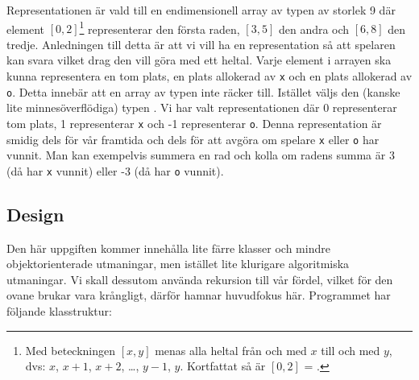 Representationen är vald till en endimensionell array av typen  av storlek 9 där element $[0,2]$\footnote{Med beteckningen $[x,y]$ menas alla heltal från och med $x$ till och med $y$, dvs: $x$, $x+1$, $x+2$, \ldots , $y-1$, $y$. Kortfattat så är $[0,2]$ = .} representerar den första raden, $[3,5]$ den andra och $[6,8]$ den tredje. Anledningen till detta är att vi vill ha en representation så att spelaren kan svara vilket drag den vill göra med ett heltal.
Varje element i arrayen ska kunna representera en tom plats, en plats allokerad av \texttt{x} och en plats allokerad av \texttt{o}. Detta innebär att en array av typen  inte räcker till. Istället väljs den (kanske lite minnesöverflödiga) typen . Vi har valt representationen där 0 representerar tom plats, 1 representerar \texttt{x} och -1 representerar \texttt{o}. Denna representation är smidig dels för vår framtida  och dels för att avgöra om spelare \texttt{x} eller \texttt{o} har vunnit. Man kan exempelvis summera en rad och kolla om radens summa är 3 (då har \texttt{x} vunnit) eller -3 (då har \texttt{o} vunnit).

\subsection{Design}
Den här uppgiften kommer innehålla lite färre klasser och mindre objekt\-orienterade utmaningar, men istället lite klurigare algoritmiska utmaningar. Vi skall dessutom använda rekursion till vår fördel, vilket för den ovane brukar vara krångligt, därför hamnar huvudfokus här. Programmet har följande klasstruktur:

